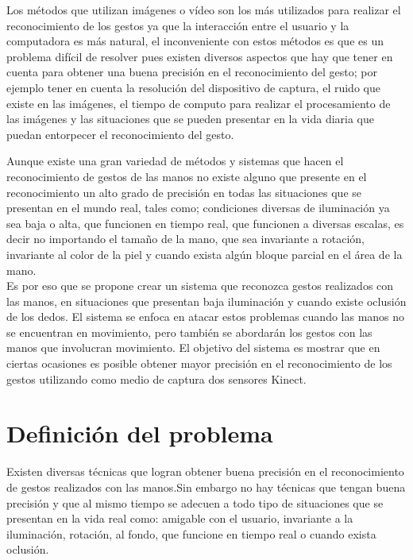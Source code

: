 Los métodos que utilizan imágenes o vídeo son los más utilizados para realizar el reconocimiento de los gestos ya que la interacción entre el usuario y la computadora es más natural, el inconveniente con estos métodos es que es un problema difícil de resolver pues existen diversos aspectos que hay que tener en cuenta para obtener una buena precisión en el reconocimiento del gesto; por ejemplo tener en cuenta la resolución del dispositivo de captura, el ruido que existe en las imágenes, el tiempo de computo para realizar el procesamiento de las imágenes y las situaciones que se pueden presentar en la vida diaria que puedan entorpecer el reconocimiento del gesto. 

Aunque existe una gran variedad de métodos y sistemas que hacen el reconocimiento de gestos de las manos no existe alguno que presente en el reconocimiento un alto grado de precisión en todas las situaciones que se presentan en el mundo real, tales como; condiciones diversas de iluminación ya sea baja o alta, que funcionen en tiempo real, que funcionen a diversas escalas, es decir no importando el tamaño de la mano, que sea invariante a rotación, invariante al color de la piel y cuando exista algún bloque parcial en el área de la mano.\\
Es por eso que se propone crear un sistema que reconozca gestos realizados con las manos, en situaciones que presentan baja iluminación y cuando existe oclusión de los dedos. 
El sistema se enfoca en atacar estos problemas cuando las manos no se encuentran en movimiento, pero también se abordar\'an los gestos con las manos que involucran movimiento. El objetivo del sistema es mostrar que en ciertas ocasiones es posible obtener mayor precisión en el reconocimiento de los gestos utilizando como medio de captura dos sensores Kinect.   




\section{Definici\'on del problema}\label{sec:DefinicionProblema}

Existen diversas técnicas que logran obtener buena precisión en el reconocimiento de gestos realizados con las manos.Sin embargo no hay técnicas que tengan buena precisión y que al mismo tiempo se adecuen a todo tipo de situaciones que se presentan en la vida real como: amigable con el usuario, invariante a la iluminación, rotación, al fondo, que funcione en tiempo real o cuando exista oclusión.


